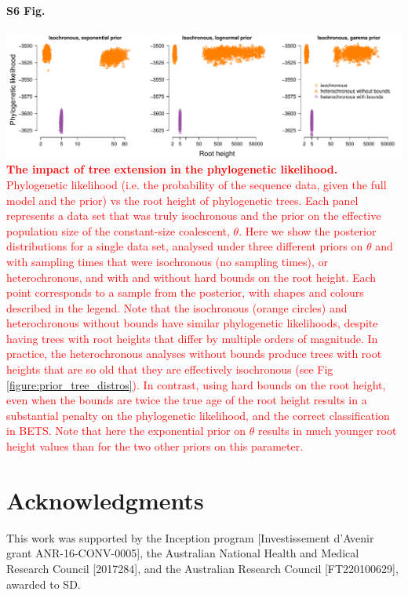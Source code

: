 \documentclass[10pt,letterpaper]{article}
\begin{document}
\paragraph*{S6 Fig.}
\label{S6_Fig}
	\begin{center}
		\includegraphics[width=14cm]{sandbox_figures/tree_extension_likelihood.pdf}\newline
		\textcolor{red}{\textbf{The impact of tree extension in the phylogenetic likelihood.} Phylogenetic likelihood (i.e. the probability of the sequence data, given the full model and the prior) vs the root height of phylogenetic trees. Each panel represents a data set that was truly isochronous and the prior on the effective population size of the constant-size coalescent, $\theta$. Here we show the posterior distributions for a single data set, analysed under three different priors on $\theta$ and with sampling times that were isochronous (no sampling times), or heterochronous, and with and without hard bounds on the root height. Each point corresponds to a sample from the posterior, with shapes and colours described in the legend. Note that the isochronous (orange circles) and heterochronous without bounds have similar phylogenetic likelihoods, despite having trees with root heights that differ by multiple orders of magnitude. In practice, the heterochronous analyses without bounds produce trees with root heights that are so old that they are effectively isochronous (see Fig \ref{figure:prior_tree_distros}). In contrast, using hard bounds on the root height, even when the bounds are twice the true age of the root height results in a substantial penalty on the phylogenetic likelihood, and the correct classification in BETS. Note that here the exponential prior on $\theta$ results in much younger root height values than for the two other priors on this parameter.}
	\end{center}


\section*{Acknowledgments}
This work was supported by the Inception program [Investissement d’Avenir grant ANR-16-CONV-0005], the Australian National Health and Medical Research Council [2017284], and the Australian Research Council [FT220100629], awarded to SD.
\end{document}
